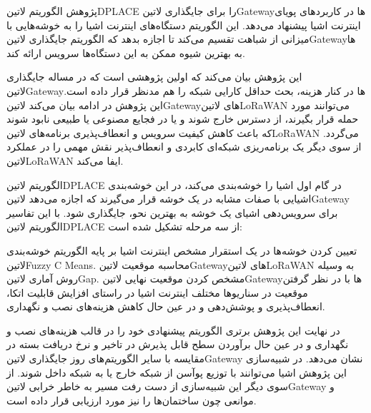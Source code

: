 
پژوهش  الگوریتم ‌لاتین{DPLACE} را برای جایگذاری ‌لاتین{Gateway}ها در کاربردهای پویای اینترنت اشیا پیشنهاد می‌دهد.
این الگوریتم دستگاه‌های اینترنت اشیا را به خوشه‌هایی با میزانی از شباهت تقسیم می‌کند تا اجازه بدهد که الگوریتم جایگذاری ‌لاتین{Gateway}ها
به بهترین شیوه ممکن به این دستگاه‌ها سرویس ارائه کند.

این پژوهش بیان می‌کند که اولین پژوهشی است که در مساله جایگذاری ‌لاتین{Gateway}ها در کنار هزینه، بحث حداقل کارایی شبکه را هم مدنظر
قرار داده است. این پژوهش در ادامه بیان می‌کند ‌لاتین{Gateway}های ‌لاتین{LoRaWAN} می‌توانند مورد حمله قرار بگیرند، از دسترس خارج شوند
و یا در فجایع مصنوعی یا طبیعی نابود شوند که باعث کاهش کیفیت سرویس و انعطاف‌پذیری برنامه‌های ‌لاتین{LoRaWAN} می‌گردد.
از سوی دیگر یک برنامه‌ریزی شبکه‌ای کابردی و انعطاف‌پذیر نقش مهمی را در عملکرد ‌لاتین{LoRaWAN} ایفا می‌کند.

الگوریتم ‌لاتین{DPLACE} در گام اول اشیا را خوشه‌بندی می‌کند، در این خوشه‌بندی اشیایی با صفات مشابه در یک خوشه قرار می‌گیرند که اجازه می‌دهد
‌لاتین{Gateway} برای سرویس‌دهی اشیای یک خوشه به بهترین نحو، جایگذاری شود. با این تفاسیر الگوریتم ‌لاتین{DPLACE} از سه مرحله تشکیل شده است:


 تعیین کردن خوشه‌ها در یک استقرار مشخص اینترنت اشیا بر پایه الگوریتم خوشه‌بندی ‌لاتین{Fuzzy C Means}.
 محاسبه موقعیت ‌لاتین{Gateway}های ‌لاتین{LoRaWAN} به وسیله روش آماری ‌لاتین{Gap}.
 مشخص کردن موقعیت نهایی ‌لاتین{Gateway}ها با در نظر گرفتن موقعیت در سناریوها مختلف اینترنت اشیا در راستای افزایش قابلیت اتکا،
انعطاف‌پذیری و پوشش‌دهی و در عین حال کاهش هزینه‌های نصب و نگهداری.


در نهایت این پژوهش برتری الگوریتم پیشنهادی خود را در قالب هزینه‌های نصب و نگهداری و در عین حال برآوردن سطح قابل پذیرش در تاخیر و نرخ دریافت بسته
در مقایسه با سایر الگوریتم‌های روز جایگذاری ‌لاتین{Gateway} نشان می‌دهد. در شبیه‌سازی این پژوهش اشیا می‌توانند با توزیع پوآسن از شبکه خارج یا به شبکه داخل شوند.
از سوی دیگر این شبیه‌سازی از دست رفت مسیر به خاطر خرابی ‌لاتین{Gateway} و موانعی چون ساختمان‌ها را نیز مورد ارزیابی قرار داده است.
